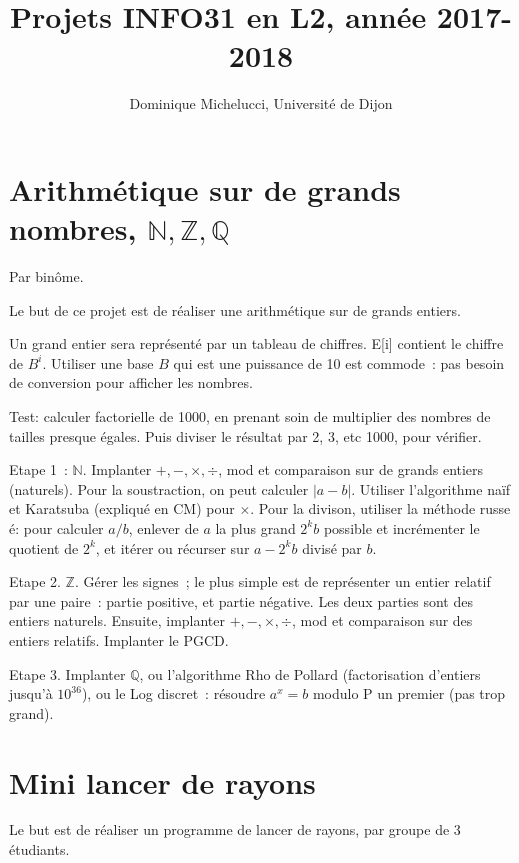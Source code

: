 \documentclass[a4paper]{article}
\def\N{\mathbb{N}}
\def\Z{\mathbb{Z}}
\def\Q{\mathbb{Q}}
\begin{document}
\title{Projets INFO31 en L2, année 2017-2018}
\author{Dominique Michelucci, Universit\'e de Dijon}
\maketitle


\section{Arithmétique sur de grands nombres, $\N, \Z, \Q$}

Par binôme.

Le but de ce projet est de réaliser une arithmétique sur de grands entiers.

Un grand entier sera représenté par un tableau de chiffres.
E[i] contient le chiffre de $B^i$. Utiliser une base $B$ qui est une puissance
de 10 est commode~: pas besoin de conversion pour afficher les nombres.

Test: calculer factorielle de 1000, en prenant soin de multiplier des nombres de tailles presque égales. Puis diviser le résultat par 2, 3, etc 1000, pour vérifier.

Etape 1~: $\N$. Implanter $+, -, \times, \div$, mod et comparaison sur de grands entiers (naturels). Pour la soustraction, on peut calculer $|a-b|$.
Utiliser l'algorithme naïf et Karatsuba (expliqué en CM) pour $\times$.
Pour la divison, utiliser la méthode russe é: pour calculer $a/b$, enlever de
$a$ la plus grand $2^kb$ possible et incrémenter le quotient de $2^k$, et itérer ou récurser sur $a-2^kb$ divisé par $b$.

Etape 2. $\Z$. Gérer les signes~; le plus simple est de représenter un entier relatif par une paire~: partie positive, et partie négative. Les deux parties sont des entiers naturels. Ensuite, implanter $+, -, \times, \div$, mod et comparaison
sur des entiers relatifs.
Implanter le PGCD.

Etape 3. Implanter $\Q$, ou l'algorithme Rho de Pollard (factorisation
d'entiers jusqu'à $10^{36}$), ou le Log discret~: résoudre $a^x=b$ modulo P un premier (pas trop grand).

\section{Mini lancer de rayons}
Le but est de réaliser un programme de lancer de rayons, par groupe de
3 étudiants.
\end{document}
